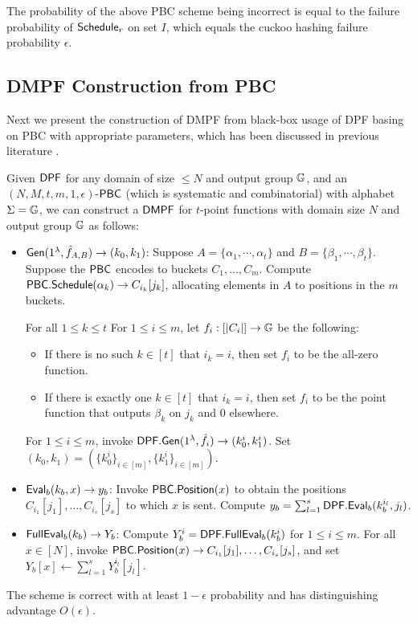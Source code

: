 The probability of the above PBC scheme being incorrect is equal to the failure probability of ${\sf Schedule}_r$ on set $I$, which equals the cuckoo hashing failure probability $\epsilon$. 

\subsection{DMPF Construction from PBC}
Next we present the construction of DMPF from black-box usage of DPF basing on PBC with appropriate parameters, which has been discussed in previous literature \cite{cryptoeprint:2019/273,cryptoeprint:2019/1084,cryptoeprint:2021/580,foleage}. 
\begin{construction}\label{con:DMPF_PBC_detail}
  Given ${\sf DPF}$ for any domain of size $\le N$ and output group $\mathbb{G}$, and an $(N,M,t,m,1,\epsilon)$-${\sf PBC}$ (which is systematic and combinatorial) with alphabet $\Sigma=\mathbb{G}$, we can construct a ${\sf DMPF}$ for $t$-point functions with domain size $N$ and output group $\mathbb{G}$ as follows: 
  \begin{itemize}
    \item ${\sf Gen}(1^\lambda, \hat{f}_{A,B})\rightarrow (k_0,k_1)$: Suppose $A=\{\alpha_1,\cdots,\alpha_t\}$ and $B=\{\beta_1,\cdots,\beta_t\}$. Suppose the ${\sf PBC}$ encodes to buckets $C_1,\dots,C_m$. Compute ${\sf PBC}.{\sf Schedule}(\alpha_k)\rightarrow C_{i_k}[j_k]$, allocating elements in $A$ to positions in the $m$ buckets.     
    
    For all $1\le k\le t$ For $1\le i\le m$, let $f_i:[|C_i|]\rightarrow \mathbb{G}$ be the following: 
    \begin{itemize}
      \item If there is no such $k\in[t]$ that $i_k = i$, then set $f_i$ to be the all-zero function. 
      \item If there is exactly one $k\in[t]$ that  $i_k = i$, then set $f_i$ to be the point function that outputs $\beta_k$ on $j_k$ and 0 elsewhere. 
    \end{itemize}
    For $1\le i\le m$, invoke ${\sf DPF}.{\sf Gen}(1^\lambda, \hat{f}_i)\rightarrow (k_0^i,k_1^i)$. Set $(k_0,k_1)=(\{k_0^i\}_{i\in [m]}, \{k_1^i\}_{i\in [m]})$. 
    \item ${\sf Eval}_b(k_b,x)\rightarrow y_b$: Invoke ${\sf PBC}.{\sf Position}(x)$ to obtain the positions $C_{i_1}[j_1],\dots,C_{i_s}[j_s]$ to which $x$ is sent. Compute $y_b=\sum_{l=1}^s{\sf DPF}.{\sf Eval}_b(k_b^{i_l},j_l)$. 
    \item ${\sf FullEval}_b(k_b)\rightarrow Y_b$: Compute $Y_b^i = {\sf DPF}.{\sf FullEval}_b(k_b^i)$ for $1\le i\le m$. For all $x\in [N]$, invoke ${\sf PBC}.{\sf Position}(x)\rightarrow C_{i_1}[j_1],\dots,C_{i_s}[j_s]$, and set $Y_b[x]\gets \sum_{l=1}^sY_b^{i_l}[j_l]$. 
  \end{itemize}
The scheme is correct with at least $1-\epsilon$ probability and has distinguishing advantage $O(\epsilon)$. 
\end{construction}

